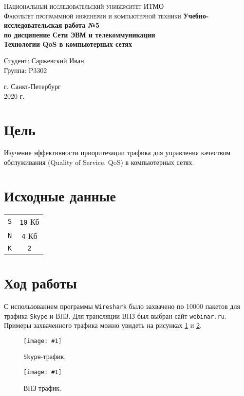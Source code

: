 \documentclass[12pt, a4paper]{article}
\newcommand{\figc}[4]{
  \begin{figure}[H]
  \begin{center}
    \texttt{[image: \#1]}
    \caption{#2}
    \label{fig:#3}
  \end{center}
  \end{figure}
}
\begin{document}
\begin{titlepage}
\begin{center}

\textsc{Национальный исследовательский университет ИТМО\\[4mm]
Факультет программной инженерии и компьютерной техники}
\vfill
\textbf{Учебно-исследовательская работа №5\\[4mm]
по дисципение Сети ЭВМ и телекоммуникации\\[4mm]
Технологии QoS в компьютерных сетях\\[16mm]
}
\begin{flushright}
Студент: Саржевский Иван
\\[2mm]Группа: P3302
\end{flushright}
\vfill
г. Санкт-Петербург\\[2mm]
2020 г.

\end{center}
\end{titlepage}

\tableofcontents
\newpage

\justify

\section{Цель}

Изучение эффективности приоритезации трафика для управления качеством
обслуживания (Quality of Service, QoS) в компьютерных сетях. 

\section{Исходные данные}

\begin{center}
\begin{tabular}{c c}
  \texttt{S} & \texttt{10} Кб\\
  \texttt{N} & \texttt{4} Кб\\
  \texttt{K} & \texttt{2}\\
\end{tabular}
\end{center}

\section{Ход работы}

С использованием программы \texttt{Wireshark} было захвачено по 10000
пакетов для трафика \texttt{Skype} и ВПЗ. Для трансляции ВПЗ был выбран
сайт \texttt{webinar.ru}. Примеры захваченного трафика можно увидеть на
рисунках \ref{fig:s_t} и \ref{fig:v_t}.

\figc{skype_traffic}{\texttt{Skype}-трафик.}{s_t}{1.0}
\figc{vod_traffic}{ВПЗ-трафик.}{v_t}{0.8}
\end{document}
